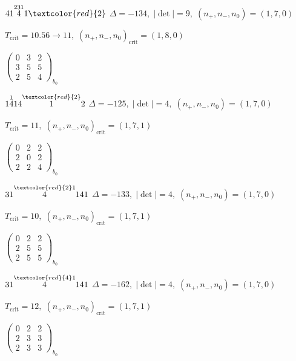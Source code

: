 \documentclass[10pt]{article}
\begin{document}
\smallskip

$41\overset{231}{4}1\textcolor{red}{2}$ \quad $\Delta=-134,\; |\det|=9,\; (n_+,n_-,n_0)=(1,7,0)$

\hspace{1em}$T_{\text{crit}}=10.56 \to 11,\; (n_+,n_-,n_0)_{\text{crit}}=(1,8,0)$

\hspace{2em}$\left(\begin{smallmatrix}0 & 3 & 2 \\ 3 & 5 & 5 \\ 2 & 5 & 4\end{smallmatrix}\right)_{\!b_0}$

\smallskip

$1\overset{1}{4}14\overset{\textcolor{red}{2}}{1}2$ \quad $\Delta=-125,\; |\det|=4,\; (n_+,n_-,n_0)=(1,7,0)$

\hspace{1em}$T_{\text{crit}}=11,\; (n_+,n_-,n_0)_{\text{crit}}=(1,7,1)$

\hspace{2em}$\left(\begin{smallmatrix}0 & 2 & 2 \\ 2 & 0 & 2 \\ 2 & 2 & 4\end{smallmatrix}\right)_{\!b_0}$

\smallskip

$31\overset{\textcolor{red}{2}1}{4}141$ \quad $\Delta=-133,\; |\det|=4,\; (n_+,n_-,n_0)=(1,7,0)$

\hspace{1em}$T_{\text{crit}}=10,\; (n_+,n_-,n_0)_{\text{crit}}=(1,7,1)$

\hspace{2em}$\left(\begin{smallmatrix}0 & 2 & 2 \\ 2 & 5 & 5 \\ 2 & 5 & 5\end{smallmatrix}\right)_{\!b_0}$

$31\overset{\textcolor{red}{4}1}{4}141$ \quad $\Delta=-162,\; |\det|=4,\; (n_+,n_-,n_0)=(1,7,0)$

\hspace{1em}$T_{\text{crit}}=12,\; (n_+,n_-,n_0)_{\text{crit}}=(1,7,1)$

\hspace{2em}$\left(\begin{smallmatrix}0 & 2 & 2 \\ 2 & 3 & 3 \\ 2 & 3 & 3\end{smallmatrix}\right)_{\!b_0}$
\end{document}
